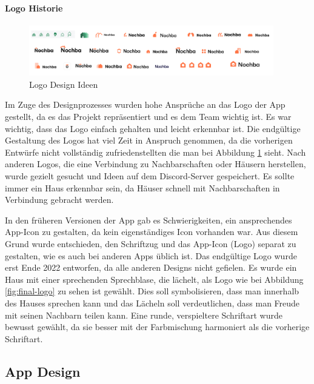 \paragraph{Logo Historie}

\begin{figure}[ht]
  \centering
  \includegraphics[width=0.95\textwidth]{pics/logo-historie.png}
  \caption{Logo Design Ideen}
  \label{fig:logo-historie}
\end{figure}

Im Zuge des Designprozesses wurden hohe Ansprüche an das
Logo der App gestellt, da es das Projekt repräsentiert und
es dem Team wichtig ist. Es
war wichtig, dass das Logo einfach gehalten und leicht
erkennbar ist. Die endgültige Gestaltung des Logos hat viel Zeit
in Anspruch genommen, da die vorherigen Entwürfe nicht
vollständig zufriedenstellten die man bei Abbildung
\ref{fig:logo-historie} sieht. Nach anderen Logos, die eine
Verbindung zu Nachbarschaften oder Häusern herstellen, wurde
gezielt gesucht und Ideen auf dem Discord-Server
gespeichert. Es sollte immer ein Haus erkennbar sein, da
Häuser schnell mit Nachbarschaften in Verbindung gebracht
werden.

In den früheren Versionen der App gab es Schwierigkeiten,
ein ansprechendes App-Icon zu gestalten, da kein
eigenständiges Icon vorhanden war. Aus diesem Grund wurde
entschieden, den Schriftzug und das App-Icon (Logo) separat
zu gestalten, wie es auch bei anderen Apps üblich ist. Das
endgültige Logo wurde erst Ende 2022 entworfen, da alle
anderen Designs nicht gefielen. Es wurde ein Haus mit einer
sprechenden Sprechblase, die lächelt, als Logo
wie bei Abbildung \ref{fig:final-logo} zu sehen ist gewählt. Dies soll symbolisieren, dass
man innerhalb des Hauses sprechen kann und das Lächeln soll
verdeutlichen, dass man Freude mit seinen Nachbarn teilen
kann. Eine runde, verspieltere Schriftart wurde bewusst
gewählt, da sie besser mit der Farbmischung harmoniert als
die vorherige Schriftart.



\subsection{App Design}
